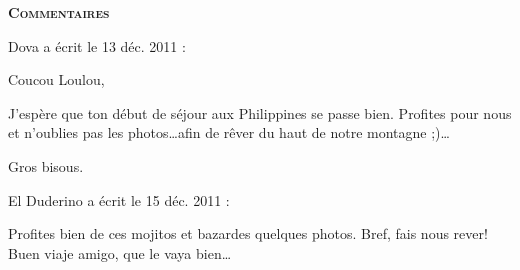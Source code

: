 \bigskip
\textbf{\textsc{Commentaires}}

\medskip
Dova a écrit le 13 déc. 2011 :
\begin{displayquote}
Coucou Loulou,

J'espère que ton début de séjour aux Philippines se passe bien.
Profites pour nous et n'oublies pas les photos\dots afin de rêver du haut de notre montagne ;)\dots

Gros bisous.
\end{displayquote}

\medskip
El Duderino a écrit le 15 déc. 2011 :
\begin{displayquote}
Profites bien de ces mojitos et bazardes quelques photos. Bref, fais nous rever!
Buen viaje amigo, que le vaya bien\dots
\end{displayquote}

\vfill
